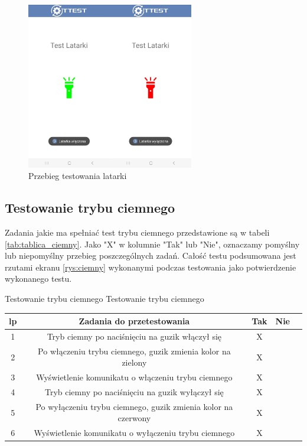 \begin{figure}[!hbt]
	\begin{center}
		\includegraphics[angle=360, width=0.65\textwidth]{rys/punkt5/latarka.jpg}
		\caption{Przebieg testowania latarki}
		\label{rys:latarka}
	\end{center}
\end{figure}   

\newpage


\subsection{Testowanie trybu ciemnego}

Zadania jakie ma spełniać test trybu ciemnego przedstawione są w tabeli \ref{tab:tablica_ciemny}. Jako "X" w kolumnie "Tak" lub "Nie", oznaczamy pomyślny lub niepomyślny przebieg poszczególnych zadań. Całość testu podsumowana jest rzutami ekranu \ref{rys:ciemny} wykonanymi podczas testowania jako potwierdzenie wykonanego testu.

\begin{tabela}
	{Testowanie trybu ciemnego}	%
	{Testowanie trybu ciemnego}	%
	{
		\begin{tabular}{|c|c|c|c|c|} \hline
			\textbf{lp} & \textbf{Zadania do przetestowania} & \textbf{Tak} & \textbf{Nie} \\ \hline
			1 & Tryb ciemny po naciśnięciu na guzik włączył się & X & ~ \\ \hline
			2 & Po włączeniu trybu ciemnego, guzik zmienia kolor na zielony & X & ~ \\ \hline
			3 & Wyświetlenie komunikatu o włączeniu trybu ciemnego & X & ~ \\ \hline
			4 & Tryb ciemny po naciśnięciu na guzik wyłączył się & X & ~ \\ \hline
			5 & Po wyłączeniu trybu ciemnego, guzik zmienia kolor na czerwony & X & ~ \\ \hline
			6 & Wyświetlenie komunikatu o wyłączeniu trybu ciemnego & X & ~ \\ \hline
	\end{tabular}	}
	\label{tab:tablica_ciemny}
\end{tabela}

